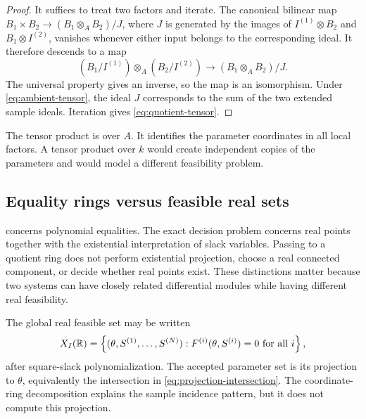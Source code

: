 \begin{proof}
It suffices to treat two factors and iterate.  The canonical bilinear map
\(B_1\times B_2\to (B_1\otimes_A B_2)/J\), where \(J\) is generated by the
images of \(I^{(1)}\otimes B_2\) and \(B_1\otimes I^{(2)}\), vanishes whenever
either input belongs to the corresponding ideal.  It therefore descends to a
map
\begin{equation}
  (B_1/I^{(1)})\otimes_A(B_2/I^{(2)})
  \longrightarrow (B_1\otimes_A B_2)/J.
\end{equation}
The universal property gives an inverse, so the map is an isomorphism.  Under
\cref{eq:ambient-tensor}, the ideal \(J\) corresponds to the sum of the two
extended sample ideals.  Iteration gives \cref{eq:quotient-tensor}.
\end{proof}

\begin{remark}
The tensor product is over \(A\).  It identifies the parameter coordinates in
all local factors.  A tensor product over \(k\) would create independent copies
of the parameters and would model a different feasibility problem.
\end{remark}

\subsection{Equality rings versus feasible real sets}

 concerns polynomial equalities.  The exact decision
problem concerns real points together with the existential interpretation of
slack variables.  Passing to a quotient ring does not perform existential
projection, choose a real connected component, or decide whether real points
exist.  These distinctions matter because two systems can have closely related
differential modules while having different real feasibility.

The global real feasible set may be written
\begin{equation}
  X_I(\mathbb{R})=\left\{(\theta,S^{(1)},\ldots,S^{(N)}):
  F^{(i)}(\theta,S^{(i)})=0\text{ for all }i\right\},
\end{equation}
after square-slack polynomialization.  The accepted parameter set is its
projection to \(\theta\), equivalently the intersection in
\cref{eq:projection-intersection}.  The coordinate-ring decomposition explains
the sample incidence pattern, but it does not compute this projection.
